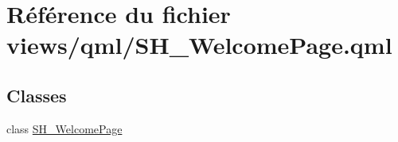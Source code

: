 \hypertarget{SH__WelcomePage_8qml}{\section{Référence du fichier views/qml/\-S\-H\-\_\-\-Welcome\-Page.qml}
\label{SH__WelcomePage_8qml}
}
\subsection*{Classes}
\begin{DoxyCompactItemize}
\item 
class \hyperlink{classSH__WelcomePage}{S\-H\-\_\-\-Welcome\-Page}
\end{DoxyCompactItemize}

